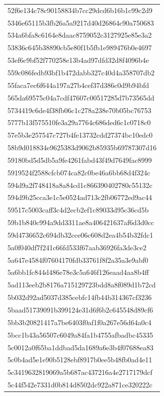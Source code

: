\begin{tabular}{l}
52f6e134c78c90158834b7cc29dcd6b16b1c99c2d9 \\
5346e65115b3fb26a5a9217d40d26864c90a750683 \\
534a6bfa8c6164e8daac8759052c3127925e85e3a2 \\
53836c645b38890cb5e80f1b5fb1e989476b0e4697 \\
53ef6c9bf52f770258e13b4ad97dfd32d8f4096b4e \\
559c086fedb93bf1b472dabb327c40d4a358707db2 \\
55faca7ec6f644a197a27b4cef37d386c0d9b94bfd \\
565da69575c04a7cdf47607c00517285d7b73565dd \\
5734419c6de4f38fb06c1c278a238e70b05bc76753 \\
5777b13f575510fe3a29a7764c686ded6c1c0718c0 \\
57e5b3e257547c727b4fe13732cdd27374bc10edc0 \\
58b9d018834e9625383d9062b85935b69787307d16 \\
59180bd5d5db5a9fe4261fabd43f49d7649fac8999 \\
5919524f2588cfcb074ca82c0be46a6bb68d4f324c \\
594d9a2f748418a8a84cd1c866390402780c55132c \\
594d9b25cca3e1c5e0524ad713c2fb06772ed9ac44 \\
59517c5003caff3c4d2ecb2ef1c89033d95c36cd5b \\
59b1b840c994a9dd3311ae8a406421637af6d3d0cc \\
59d4736652c694db32cce06c608d2ea4b54b32fdc1 \\
5a0f040df7f241c66fd533f67aab36926fa3de3ce2 \\
5a647e4584f07604170fdb33761f8f2a35a3e9abf0 \\
5a6bb1fc844d486e78e3c5a646f126eaad4aa8b4ff \\
5ad113eeb2b8176a715129723bdd8a8f089d1b72cd \\
5b032d92ad5037d385cebfc14fb44b314367cf3236 \\
5baad51739091b399124e31d6f6b2c645548d89cf6 \\
5bb3b20821417a7be6403f0af1f0a267e56d64a0c4 \\
5bcc1b43a56507c6049a84fa1b4755afbadbc45335 \\
5c0012a0f65ba1ddbad5da1689a6e3b4f07688ea83 \\
5c0b4ad5e1e90b5128ebf8917b0ee5b48fb0ad4e11 \\
5c3419632819069a5b687ac437216a4e2717179dcf \\
5c44f542e7331d0b814d8502dc922a871ce320222c \\

\end{tabular}

